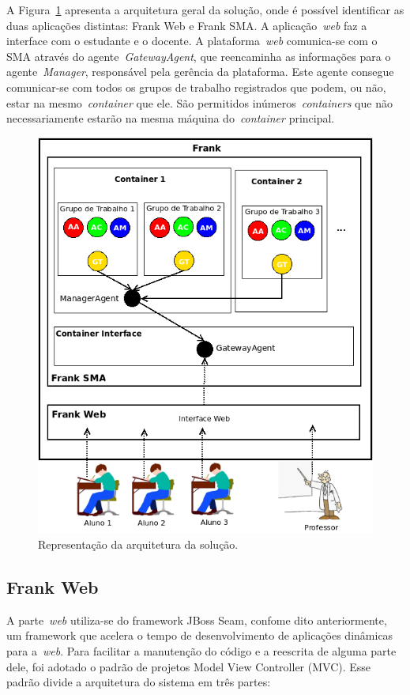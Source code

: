 A Figura~\ref{fig:arquitetura-frank} apresenta a arquitetura geral da solução, onde é possível identificar as duas aplicações distintas: Frank Web e Frank SMA. A aplicação~\emph{web} faz a interface com o estudante e o docente. A plataforma~\emph{web} comunica-se com o SMA através do agente~\emph{GatewayAgent}, que reencaminha as informações para o agente~\emph{Manager}, responsável pela gerência da plataforma. Este agente consegue comunicar-se com todos os grupos de trabalho registrados que podem, ou não, estar na mesmo~\emph{container} que ele. São permitidos inúmeros~\emph{containers} que não necessariamente estarão na mesma máquina do~\emph{container} principal.
\begin{figure}
	\centering
	\includegraphics[scale=0.6]{images/arquitetura-frank.png}
	\caption{Representação da arquitetura da solução.}
	\label{fig:arquitetura-frank}
\end{figure}

\subsection{Frank Web}
A parte~\emph{web} utiliza-se do framework JBoss Seam, confome dito anteriormente, um framework que acelera o tempo de desenvolvimento de aplicações dinâmicas para a~\emph{web}. Para facilitar a manutenção do código e a reescrita de alguma parte dele, foi adotado o padrão de projetos
Model View Controller (MVC). Esse padrão divide a arquitetura do sistema em três partes:

